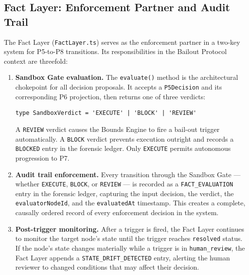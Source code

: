 \subsection{Fact Layer: Enforcement Partner and Audit Trail}

The Fact Layer (\texttt{FactLayer.ts}) serves as the enforcement partner in a
two-key system for P5-to-P8 transitions.  Its responsibilities in the Bailout
Protocol context are threefold:

\begin{enumerate}
  \item \textbf{Sandbox Gate evaluation.}  The \texttt{evaluate()} method is the
        architectural chokepoint for all decision proposals.  It accepts a
        \texttt{P5Decision} and its corresponding P6 projection, then returns one
        of three verdicts:

\begin{verbatim}
type SandboxVerdict = 'EXECUTE' | 'BLOCK' | 'REVIEW'
\end{verbatim}

        A \texttt{REVIEW} verdict causes the Bounds Engine to fire a bail-out trigger
        automatically.  A \texttt{BLOCK} verdict prevents execution outright and
        records a \texttt{BLOCKED} entry in the forensic ledger.  Only \texttt{EXECUTE}
        permits autonomous progression to P7.

  \item \textbf{Audit trail enforcement.}  Every transition through the Sandbox Gate
        — whether \texttt{EXECUTE}, \texttt{BLOCK}, or \texttt{REVIEW} — is recorded
        as a \texttt{FACT\_EVALUATION} entry in the forensic ledger, capturing the
        input decision, the verdict, the \texttt{evaluatorNodeId}, and the
        \texttt{evaluatedAt} timestamp.  This creates a complete, causally ordered
        record of every enforcement decision in the system.

  \item \textbf{Post-trigger monitoring.}  After a trigger is fired, the Fact Layer
        continues to monitor the target node's state until the trigger reaches
        \texttt{resolved} status.  If the node's state changes materially while a
        trigger is in \texttt{human\_review}, the Fact Layer appends a
        \texttt{STATE\_DRIFT\_DETECTED} entry, alerting the human reviewer to
        changed conditions that may affect their decision.
\end{enumerate}

